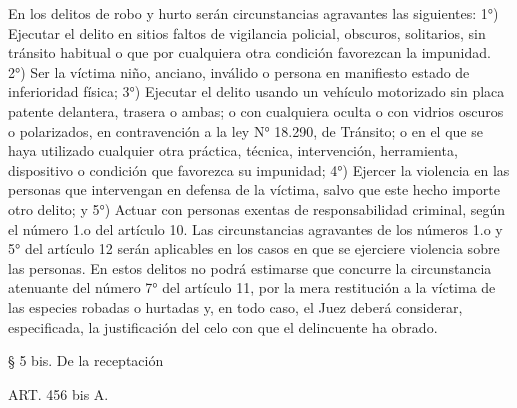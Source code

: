     En los delitos de robo y hurto serán circunstancias agravantes las siguientes:
    1°) Ejecutar el delito en sitios faltos de vigilancia policial, obscuros, solitarios, sin tránsito habitual o que por cualquiera otra condición favorezcan la impunidad.
    2°) Ser la víctima niño, anciano, inválido o persona en manifiesto estado de inferioridad física;
    3°) Ejecutar el delito usando un vehículo motorizado sin placa patente delantera, trasera o ambas; o con cualquiera oculta o con vidrios oscuros o polarizados, en contravención a la ley N° 18.290, de Tránsito; o en el que se haya utilizado cualquier otra práctica, técnica, intervención, herramienta, dispositivo o condición que favorezca su impunidad;
    4°) Ejercer la violencia en las personas que intervengan en defensa de la víctima, salvo que este hecho importe otro delito; y
    5°) Actuar con personas exentas de responsabilidad criminal, según el número 1.o del artículo 10.
    Las circunstancias agravantes de los números 1.o y 5° del artículo 12 serán aplicables en los casos en que se ejerciere violencia sobre las personas.
    En estos delitos no podrá estimarse que concurre la circunstancia atenuante del número 7° del artículo 11, por la mera restitución a la víctima de las especies robadas o hurtadas y, en todo caso, el Juez deberá considerar, especificada, la justificación del celo con que el delincuente ha obrado.



    § 5 bis. De la receptación

    ART. 456 bis A.

